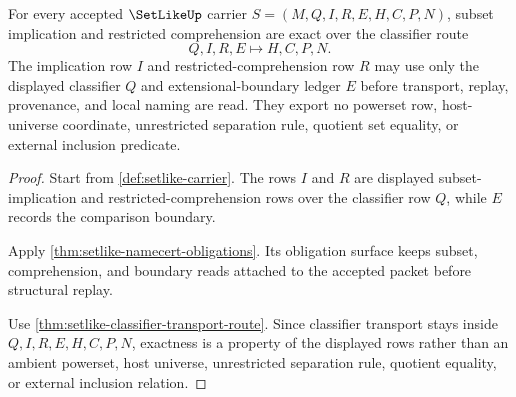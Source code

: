 \begin{theorem}
\label{thm:setlike-subset-classifier-exactness}
For every accepted $\SetLikeUp$ carrier $S=(M,Q,I,R,E,H,C,P,N)$, subset implication and restricted comprehension are exact over the classifier route
$$
Q,I,R,E \longmapsto H,C,P,N .
$$
The implication row $I$ and restricted-comprehension row $R$ may use only the displayed classifier $Q$ and extensional-boundary ledger $E$ before transport, replay, provenance, and local naming are read. They export no powerset row, host-universe coordinate, unrestricted separation rule, quotient set equality, or external inclusion predicate.
\end{theorem}
\begin{proof}
Start from \autoref{def:setlike-carrier}. The rows $I$ and $R$ are displayed subset-implication and restricted-comprehension rows over the classifier row $Q$, while $E$ records the comparison boundary.

Apply \autoref{thm:setlike-namecert-obligations}. Its obligation surface keeps subset, comprehension, and boundary reads attached to the accepted packet before structural replay.

Use \autoref{thm:setlike-classifier-transport-route}. Since classifier transport stays inside $Q,I,R,E,H,C,P,N$, exactness is a property of the displayed rows rather than an ambient powerset, host universe, unrestricted separation rule, quotient equality, or external inclusion relation.
\end{proof}



